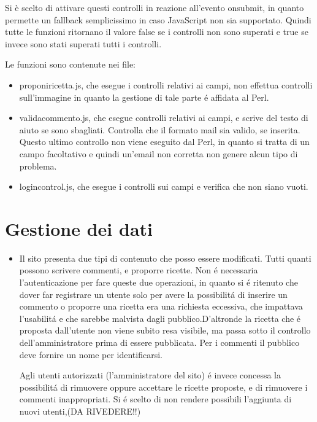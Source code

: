 \documentclass[12pt]{article}
\begin{document}
\begin{itemize}
				Si è scelto di attivare questi controlli in reazione all'evento onsubmit, in quanto permette un
				fallback semplicissimo in caso JavaScript non sia supportato. Quindi tutte le funzioni ritornano il
				valore false se i controlli non sono superati e true se invece sono stati superati tutti i controlli.
				
				Le funzioni sono contenute nei file:
				\begin{itemize}
					\item proponiricetta.js, che esegue i controlli relativi ai campi, non effettua controlli sull'immagine in quanto la gestione di tale parte \'e affidata al Perl.
				\end{itemize}
				\begin{itemize}
					\item validacommento.js, che esegue controlli relativi ai campi, e scrive del testo di aiuto se sono sbagliati. Controlla che il formato mail sia valido, se inserita. Questo ultimo controllo non viene eseguito dal Perl, in quanto si tratta di un campo facoltativo e quindi un'email non corretta non genere alcun tipo di problema. 
				\end{itemize}
				\begin{itemize}
					\item logincontrol.js, che esegue i controlli sui campi e verifica che non siano vuoti.
				\end{itemize}	
			\end{itemize}
		
		\section{Gestione dei dati}
		\begin{itemize}
			\item Il sito presenta due tipi di contenuto che posso essere modificati.
			Tutti quanti possono scrivere commenti, e proporre ricette. Non \'e necessaria l'autenticazione per fare queste due operazioni, in quanto si \'e ritenuto che dover far registrare un utente solo per avere la possibilit\'a di inserire un commento o proporre una ricetta era una richiesta eccessiva, che impattava l'usabilit\'a e che sarebbe malvista dagli pubblico.D'altronde la ricetta che \'e proposta dall'utente non viene subito resa visibile, ma passa sotto il controllo dell'amministratore prima di essere pubblicata.
			Per i commenti il pubblico deve fornire un nome per identificarsi.
			
			
			Agli utenti autorizzati (l'amministratore del sito) \'e invece concessa la possibilit\'a di rimuovere oppure accettare le ricette proposte, e di rimuovere i commenti inappropriati. Si \'e scelto di non rendere possibili l'aggiunta di nuovi utenti,(DA RIVEDERE!!)
		\end{itemize}
\end{document}
